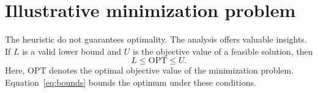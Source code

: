 \documentclass{article}
\newcommand{\OPT}{\mathrm{OPT}}
\begin{document}
\section{Illustrative minimization problem}
The heuristic do not guarantees optimality.
The analysis offers valuable insights.
If $L$ is a valid lower bound and $U$ is the objective value of a feasible solution, then
\begin{equation}
L \le \OPT \le U.
\label{eq:bounds}
\end{equation}
Here, $\OPT$ denotes the optimal objective value of the minimization problem.
Equation~\eqref{eq:bounds} bounds the optimum under these conditions.
\end{document}
